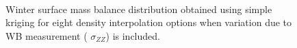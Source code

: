 \documentclass{sfuthesis}
\begin{document}
\begin{appendices}
\begin{figure}[H]
	\centering
	\\
	\caption[]{Winter surface mass balance distribution obtained using simple kriging for eight density interpolation options when variation due to WB measurement ( $\sigma_{ZZ}$) is included. }
	\label{fig:WSMB_SK_Distributionzz}
\end{figure}
\begin{figure}[H]
	\centering
	\\

\end{figure}
\end{appendices}
\end{document}
